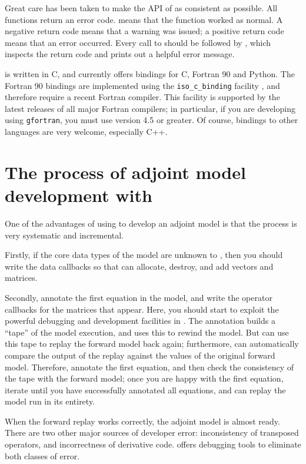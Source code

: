 Great care has been taken to make the API of \libadjoint as consistent as possible. All functions
return an error code.  means that the function worked as normal. A negative
return code means that a warning was issued; a positive return code means that an error occurred.
Every call to \libadjoint should be followed by , which inspects the return
code and prints out a helpful error message.

\libadjoint is written in C, and currently offers bindings for C, Fortran 90 and Python. The Fortran 90 bindings
are implemented using the \texttt{iso_c_binding} facility \citep{metcalf2004}, and therefore require a recent
Fortran compiler. This facility is supported by the latest releases of all major Fortran compilers; in particular,
if you are developing using \texttt{gfortran}, you must use version 4.5 or greater.
Of course, bindings to other languages are very welcome, especially C++.

\section{The process of adjoint model development with \libadjoint}
One of the advantages of using \libadjoint to develop an adjoint model is that the process
is very systematic and incremental. 

Firstly, if the core data types of the model are unknown to \libadjoint, then you
should write the data callbacks so that \libadjoint can allocate, destroy, and add
vectors and matrices.

Secondly, annotate the first equation in the model, and write the operator
callbacks for the matrices that appear. Here, you should start to
exploit the powerful debugging and development facilities in \libadjoint. The
annotation builds a ``tape'' of the model execution, and \libadjoint uses this
to rewind the model. But \libadjoint can use this tape to replay the forward
model back again; furthermore, \libadjoint can automatically compare the output
of the replay against the values of the original forward model. Therefore,
annotate the first equation, and then check the consistency of the tape with the
forward model; once you are happy with the first equation, iterate until you have
successfully annotated all equations, and can replay the model run in its
entirety.

When the forward replay works correctly, the adjoint model is almost ready.
There are two other major sources of developer error: inconsistency of
transposed operators, and incorrectness of derivative code. \libadjoint
offers debugging tools to eliminate both classes of error. 

